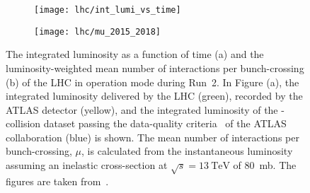 \begin{figure}[htbp]
  \centering

  \begin{subfigure}{0.47\textwidth}
    \texttt{[image: lhc/int\_lumi\_vs\_time]}
    \subcaption{}%
    \label{fig:atlas_int_lumi_vs_time}
  \end{subfigure}\hspace*{0.02\textwidth}%
  \begin{subfigure}{0.47\textwidth}
    \texttt{[image: lhc/mu\_2015\_2018]}
    \subcaption{}%
    \label{fig:atlas_mu}
  \end{subfigure}

  \caption{The integrated luminosity as a function of time (a) and the
    luminosity-weighted mean number of interactions per bunch-crossing (b) of
    the LHC in \pp operation mode during Run~2. In Figure (a), the integrated
    luminosity delivered by the LHC (green), recorded by the ATLAS detector
    (yellow), and the integrated luminosity of the \pp-collision dataset passing
    the data-quality criteria~\cite{DAPR-2018-01} of the ATLAS collaboration
    (blue) is shown. The mean number of interactions per bunch-crossing, $\mu$,
    is calculated from the instantaneous luminosity assuming an inelastic \pp
    cross-section at $\sqrt{s} = \SI{13}{\TeV}$ of \SI{80}{\milli\barn}. The
    figures are taken from~\cite{atlas_luminosity_summary_plots}.}%
  \label{fig:lumi_and_pu}
\end{figure}

